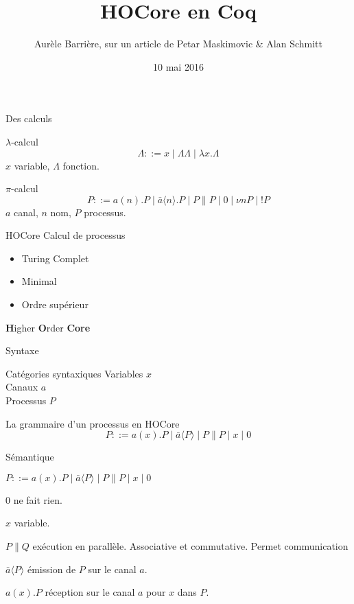 \documentclass{beamer}
\title{HOCore en Coq}
\date{10 mai 2016}
\author[Aurèle Barrière]{Aurèle Barrière, sur un article de Petar Maskimovic \& Alan Schmitt}
\begin{document}
\begin{frame}
\maketitle
\end{frame}

\begin{frame}{Des calculs}
\begin{block}{$\lambda$-calcul}
$$\Lambda ::= x \mid \Lambda\Lambda \mid \lambda x.\Lambda$$
$x$ variable, $\Lambda$ fonction.
\end{block}
\begin{block}{$\pi$-calcul}
$$ P ::= a(n).P \mid \bar{a}\langle n\rangle .P \mid P\|P \mid 0 \mid \nu n P\mid !P $$
$a$ canal, $n$ nom, $P$ processus.
\end{block}
\end{frame}


\begin{frame}{HOCore}
Calcul de processus

\begin{itemize}
\item Turing Complet
\item Minimal
\item Ordre supérieur
\end{itemize}

\textbf{H}igher \textbf{O}rder \textbf{Core}
\end{frame}

\begin{frame}{Syntaxe}
\begin{block}{Catégories syntaxiques}
Variables $x$\\
Canaux $a$\\
Processus $P$
\end{block}

La grammaire d'un processus en HOCore
$$ P ::= a(x).P \mid \bar{a}\langle P\rangle \mid P\|P \mid x \mid 0 $$

\end{frame}

\begin{frame}{Sémantique}

\begin{alertblock}{}
$ P ::= a(x).P \mid \bar{a}\langle P\rangle \mid P\|P \mid x \mid 0 $
\end{alertblock}


$0$ ne fait rien.

$x$ variable.

$P\|Q$ exécution en parallèle. Associative et commutative. Permet communication

$\bar{a}\langle P\rangle$ émission de $P$ sur le canal $a$.

$a(x).P$ réception sur le canal $a$ pour $x$ dans $P$.

\end{frame}
\end{document}
